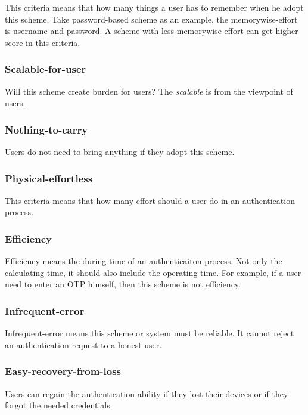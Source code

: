 \begin{CJK}{Bg5}{bsmi}
This criteria means that how many things a user has to remember when he adopt this scheme. Take password-based scheme as an example, the memorywise-effort is username and password. A scheme with less memorywise effort can get higher score in this criteria.

\subsubsection{Scalable-for-user}

Will this scheme create burden for users? The \emph{scalable} is from the viewpoint of users.

\subsubsection{Nothing-to-carry}

Users do not need to bring anything if they adopt this scheme.

\subsubsection{Physical-effortless}

This criteria means that how many effort should a user do in an authentication process.

\subsubsection{Efficiency}

Efficiency means the during time of an authenticaiton process. Not only the calculating time, it should also include the operating time. For example, if a user need to enter an OTP himself, then this scheme is not efficiency.

\subsubsection{Infrequent-error}

Infrequent-error means this scheme or system must be reliable. It cannot reject an authentication request to a honest user.

\subsubsection{Easy-recovery-from-loss}

Users can regain the authentication ability if they lost their devices or if they forgot the needed credentials.


\end{CJK}

